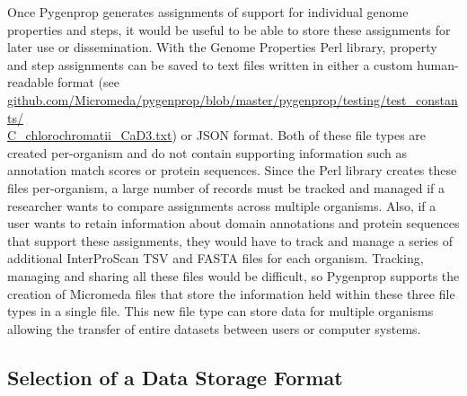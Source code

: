 Once Pygenprop generates assignments of support for individual genome properties and steps, it would be useful to be able to store these assignments for later use or dissemination. With the Genome Properties Perl library, property and step assignments can be saved to text files written in either a custom human-readable format (see \\ \href{github.com/Micromeda/pygenprop/blob/master/pygenprop/testing/test\_constants/C\_chlorochromatii\_CaD3.txt}{github.com/Micromeda/pygenprop/blob/master/pygenprop/testing/test\_constants/ \\ C\_chlorochromatii\_CaD3.txt}) or JSON format. Both of these file types are created per-organism and do not contain supporting information such as annotation match scores or protein sequences. Since the Perl library creates these files per-organism, a large number of records must be tracked and managed if a researcher wants to compare assignments across multiple organisms. Also, if a user wants to retain information about domain annotations and protein sequences that support these assignments, they would have to track and manage a series of additional InterProScan TSV and FASTA files for each organism. Tracking, managing and sharing all these files would be difficult, so Pygenprop supports the creation of Micromeda files that store the information held within these three file types in a single file. This new file type can store data for multiple organisms allowing the transfer of entire datasets between users or computer systems.

\subsection{Selection of a Data Storage Format}

